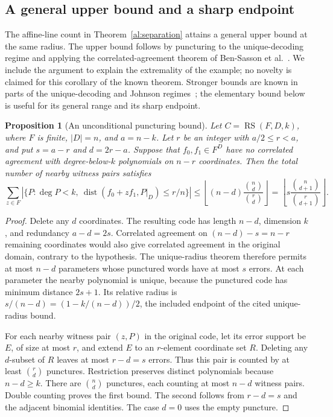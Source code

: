 \documentclass[11pt,letterpaper]{article}
\newtheorem{proposition}[theorem]{Proposition}
\theoremstyle{definition}
\theoremstyle{remark}
\newcommand{\RS}{\operatorname{RS}}
\newcommand{\dist}{\operatorname{dist}}
\begin{document}
\subsection{A general upper bound and a sharp endpoint}
\label{sec:puncturing-bound}

The affine-line count in Theorem~\ref{al:separation} attains a general
upper bound at the same radius. The upper bound follows by puncturing
to the unique-decoding regime and applying the correlated-agreement
theorem of Ben-Sasson et al.~\cite[Theorems~1.2 and~1.4]{bciks}.
We include the argument to explain the extremality of the example;
no novelty is claimed for this corollary of the known theorem.
Stronger bounds are known in parts of the unique-decoding and Johnson
regimes~\cite[Corollary~1.4 and Theorem~1.5]{bchks}; the elementary
bound below is useful for its general range and its sharp endpoint.

\begin{proposition}[An unconditional puncturing bound]
\label{prop:puncturing-bound}
Let $C=\RS(F,D,k)$, where $F$ is finite, $|D|=n$, and $a=n-k$.
Let $r$ be an integer with $a/2\le r<a$, and put
$s=a-r$ and $d=2r-a$. Suppose that $f_0,f_1\in F^D$ have no
correlated agreement with degree-below-$k$ polynomials on $n-r$
coordinates. Then the total number of nearby witness pairs satisfies
\[
 \sum_{z\in F}\left|\{P:\deg P<k,\ \dist(f_0+zf_1,P|_D)\le r/n\}\right|
 \le\left\lfloor
 (n-d)\frac{\binom nd}{\binom rd}\right\rfloor
 =\left\lfloor s\frac{\binom n{d+1}}{\binom r{d+1}}\right\rfloor.
\]
\end{proposition}
\begin{proof}
Delete any $d$ coordinates. The resulting code has length $n-d$,
dimension $k$, and redundancy $a-d=2s$. Correlated agreement on
$(n-d)-s=n-r$ remaining coordinates would also give correlated
agreement in the original domain, contrary to the hypothesis.
The unique-radius theorem therefore permits at most $n-d$
parameters whose punctured words have at most $s$ errors. At each
parameter the nearby polynomial is unique, because the punctured
code has minimum distance $2s+1$. Its
relative radius is $s/(n-d)=(1-k/(n-d))/2$, the included endpoint
of the cited unique-radius bound.

For each nearby witness pair $(z,P)$ in the original code, let its
error support be $E$, of size at most $r$, and extend $E$ to an
$r$-element coordinate set $R$. Deleting any $d$-subset of $R$
leaves at most $r-d=s$ errors. Thus this pair is counted by
at least $\binom rd$ punctures. Restriction preserves distinct
polynomials because $n-d\ge k$. There are $\binom nd$ punctures,
each counting at most $n-d$ witness pairs. Double counting proves the
first bound. The second follows from $r-d=s$ and the adjacent
binomial identities. The case $d=0$ uses the empty puncture.
\end{proof}
\end{document}
